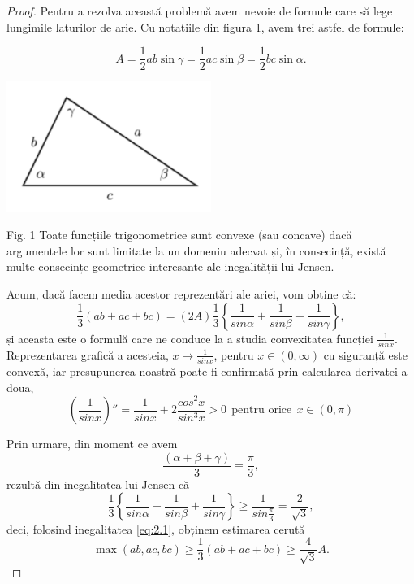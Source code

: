 \documentclass[a4paper,12pt,oneside]{report}
\begin{document}
\begin{proof}
	Pentru a rezolva această problemă avem nevoie de formule care să lege lungimile laturilor de arie. Cu notațiile din figura 1, avem trei astfel de formule:

\begin{displaymath}
  A = \frac{1}{2}ab \sin\gamma = \frac{1}{2}ac \sin \beta = \frac{1}{2}bc \sin \alpha.
\end{displaymath}
\begin{center}
    \includegraphics[width=0.5\textwidth]{fig2.1.png}
\end{center}

Fig. 1  Toate funcțiile trigonometrice sunt convexe (sau concave) dacă
argumentele lor sunt limitate la un domeniu adecvat și, în consecință,
există multe consecințe geometrice interesante ale inegalității lui Jensen.


Acum, dacă facem media acestor reprezentări ale ariei, vom obtine că:
\begin{displaymath}
  \frac{1}{3}\left ( ab + ac + bc \right )= \left ( 2A \right )\frac{1}{3}\left \{ \frac{1}{sin \alpha } + \frac{1}{sin \beta } + \frac{1}{sin \gamma }\right \}, \label{eq:2.1} \tag{2.1}
\end{displaymath}
și aceasta este o formulă care ne conduce la a studia convexitatea funcției \(\frac{1}{sin x}\). Reprezentarea grafică a acesteia, \(x \mapsto \frac{1}{sin x}\), pentru \(x\in \left ( 0, \infty  \right )\) cu siguranță este convexă, iar presupunerea noastră poate fi confirmată prin calcularea derivatei a doua,
\begin{displaymath}
  {\left ( \frac{1}{sin x} \right )}''= \frac{1}{sin x} + 2\frac{cos^{2}x}{sin ^{3}x}> 0~~ \text{pentru orice}~~ x\in \left ( 0, \pi  \right )  \label{eq:2.2} \tag{2.2}
\end{displaymath}

	Prin urmare, din moment ce avem \[\frac{\left ( \alpha + \beta  + \gamma  \right )}{3}= \frac{\pi }{3},\] rezultă din inegalitatea lui Jensen că
\begin{displaymath}
  \frac{1}{3}\left \{ \frac{1}{sin \alpha }  + \frac{1}{sin \beta } + \frac{1}{sin \gamma }\right \}\geq \frac{1}{sin \frac{\pi }{3}} =  \frac{2}{\sqrt{3}},
\end{displaymath}
deci, folosind inegalitatea \ref{eq:2.1}, obținem estimarea cerută
\begin{displaymath}
 \max \left ( ab, ac, bc \right )\geq \frac{1}{3}\left ( ab + ac + bc \right )\geq \frac{4}{\sqrt{3}}A. \label{eq:2.3} \tag{2.3}
\end{displaymath}

\end{proof}
\end{document}
